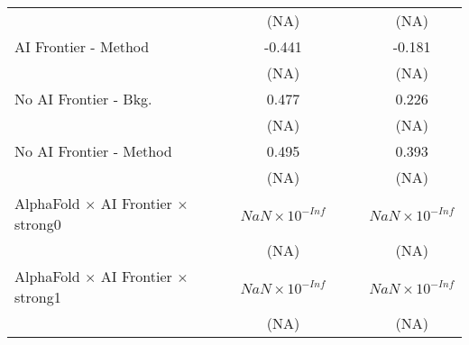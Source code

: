 \begin{tabular}{lcccccc}
                                                                              &                        &                        & (NA)                   &                        &                        & (NA)\\   
   AI Frontier - Method                                                       &                        &                        & -0.441                 &                        &                        & -0.181\\   
                                                                              &                        &                        & (NA)                   &                        &                        & (NA)\\   
   No AI Frontier - Bkg.                                                      &                        &                        & 0.477                  &                        &                        & 0.226\\   
                                                                              &                        &                        & (NA)                   &                        &                        & (NA)\\   
   No AI Frontier - Method                                                    &                        &                        & 0.495                  &                        &                        & 0.393\\   
                                                                              &                        &                        & (NA)                   &                        &                        & (NA)\\   
   AlphaFold $\times$ AI Frontier $\times$ strong0                            &                        &                        & $NaN\times 10^{-Inf}$  &                        &                        & $NaN\times 10^{-Inf}$\\    
                                                                              &                        &                        & (NA)                   &                        &                        & (NA)\\   
   AlphaFold $\times$ AI Frontier $\times$ strong1                            &                        &                        & $NaN\times 10^{-Inf}$  &                        &                        & $NaN\times 10^{-Inf}$\\    
                                                                              &                        &                        & (NA)                   &                        &                        & (NA)\\   

\end{tabular}
